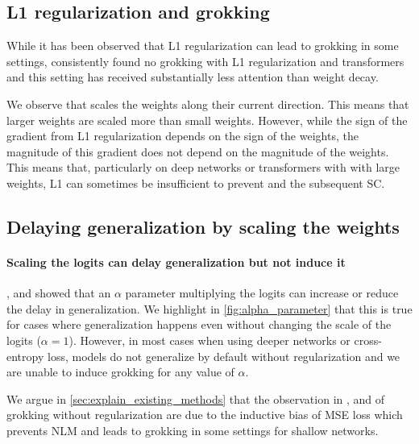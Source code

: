 \subsection{L1 regularization and grokking}\label{app:l1_grokking}

While it has been observed that L1 regularization can lead to grokking in some settings, \cite{Nanda2023-hf}
consistently found no grokking with L1 regularization and transformers and this setting has received substantially less attention than weight decay. 

We observe that \nlm scales the weights along their current direction. This means that larger weights are scaled more than small weights. However, while the sign of the gradient from L1 regularization depends on the sign of the weights, the magnitude of this gradient does not depend on the magnitude of the weights. This means that, particularly on deep networks or transformers with with large weights, L1 can sometimes be insufficient to prevent \nlm and the subsequent SC. 

\subsection{Delaying generalization by scaling the weights} \label{app:scaling_weights}

\paragraph{Scaling the logits can delay generalization but not induce it} \cite{liu2023omnigrok}, \cite{Kumar2023-hz} and \cite{Lyu2023-ga} showed that an $\alpha$ parameter multiplying the logits can increase or reduce the delay in generalization. We highlight in \cref{fig:alpha_parameter} that this is true for cases where generalization happens even without changing the scale of the logits ($\alpha=1$). However, in most cases when using deeper networks or cross-entropy loss, models do not generalize by default without regularization and we are unable to induce grokking for any value of $\alpha$. 

We argue in \cref{sec:explain_existing_methods} that the observation in \cite{liu2023omnigrok}, \cite{Kumar2023-hz} and \cite{Lyu2023-ga} of grokking without regularization are due to the inductive bias of MSE loss which prevents NLM and leads to grokking in some settings for shallow networks.

